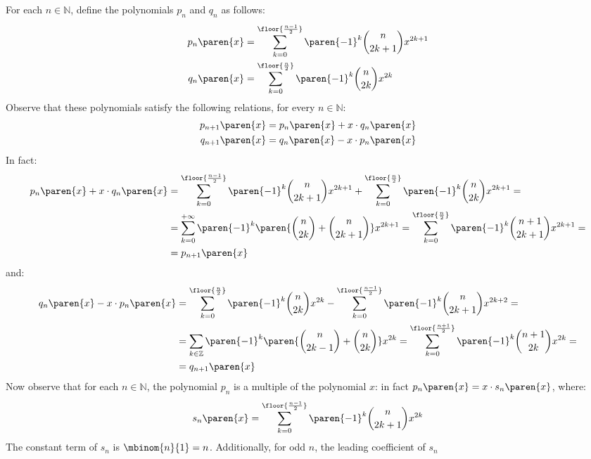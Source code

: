 For each $n \in \mathbb{N}$, define the polynomials $p_n$ and $q_n$ as follows:
\begin{align*}
  p_n\paren{x} &= \sum\limits_{k=0}^{\floor{\frac{n-1}{2}}}
     {\paren{-1}^{k} \binom{n}{2 k + 1} x^{2 k + 1}} \\
  q_n\paren{x} &= \sum\limits_{k=0}^{\floor{\frac{n}{2}}}
     {\paren{-1}^{k} \binom{n}{2 k} x^{2 k}}
\end{align*}
Observe that these polynomials satisfy the following relations,
for every $n \in \mathbb{N}$:
\begin{align*}
  p_{n+1}\paren{x} &= p_n\paren{x} + x \cdot q_n\paren{x} \\
  q_{n+1}\paren{x} &= q_n\paren{x} - x \cdot p_n\paren{x}
\end{align*}
In fact:
\begin{align*}
  p_n\paren{x} + x \cdot q_n\paren{x}
  &= \sum\limits_{k=0}^{\floor{\frac{n-1}{2}}}
     {\paren{-1}^{k} \binom{n}{2 k + 1} x^{2 k + 1}}
     + \sum\limits_{k=0}^{\floor{\frac{n}{2}}}
     {\paren{-1}^{k} \binom{n}{2 k} x^{2 k + 1}} = \\
  &= \sum\limits_{k=0}^{+ \infty}
     {\paren{-1}^{k} \paren{\binom{n}{2 k}
     + \binom{n}{2 k + 1}} x^{2 k + 1}}
   = \sum\limits_{k=0}^{\floor{\frac{n}{2}}}
     {\paren{-1}^{k} \binom{n + 1}{2 k + 1} x^{2 k + 1}} = \\
  &= p_{n+1}\paren{x}
\end{align*}
and:
\begin{align*}
  q_n\paren{x} - x \cdot p_n\paren{x}
  &= \sum\limits_{k=0}^{\floor{\frac{n}{2}}}
     {\paren{-1}^{k} \binom{n}{2 k} x^{2 k}}
     - \sum\limits_{k=0}^{\floor{\frac{n-1}{2}}}
     {\paren{-1}^{k} \binom{n}{2 k + 1} x^{2 k + 2}} = \\
  &= \sum\limits_{k \in \mathbb{Z}}
     {\paren{-1}^{k} \paren{\binom{n}{2 k - 1}
     + \binom{n}{2 k}} x^{2 k}}
   = \sum\limits_{k=0}^{\floor{\frac{n+1}{2}}}
     {\paren{-1}^{k} \binom{n+1}{2 k} x^{2 k}} = \\
  &= q_{n+1}\paren{x}
\end{align*}
Now observe that for each $n \in \mathbb{N}$,
the polynomial $p_n$ is a multiple of the polynomial $x$:
in fact $p_n\paren{x} = x \cdot s_n\paren{x}$, where:
\begin{align*}
  s_n\paren{x}
  = \sum\limits_{k=0}^{\floor{\frac{n-1}{2}}}
    {\paren{-1}^{k} \binom{n}{2 k + 1} x^{2 k}}
\end{align*}
The constant term of $s_n$ is $\mbinom{n}{1} = n$.
Additionally, for odd $n$, the leading coefficient of $s_n$
